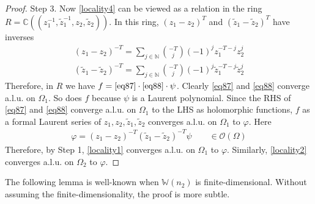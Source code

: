 \documentclass[11pt,b5paper,notitlepage]{article}
\theoremstyle{definition}
\theoremstyle{plain}
\newcommand{\mc}{\mathcal}
\newcommand{\wtd}{\widetilde}
\newcommand{\Wbb}{\mathbb W}
\newcommand{\Cbb}{\mathbb C}
\newcommand{\Nbb}{\mathbb N}
\newcommand{\<}{\left\langle}
\renewcommand{\>}{\right\rangle}
\numberwithin{equation}{subsection}
\begin{document}
\begin{proof}
Step 3. Now \eqref{locality4} can be viewed as a relation in the ring $R=\Cbb((z_1^{-1},\wtd z_1^{-1},z_2,\wtd z_2))$. In this ring, $(z_1-z_2)^T$ and $(\wtd z_1-\wtd z_2)^T$ have inverses
\begin{gather}
    (z_1-z_2)^{-T}=\sum_{j\in \Nbb}\binom{-T}{j}(-1)^j z_1^{-T-j}z_2^j  \label{eq87}\\
    (\wtd z_1-\wtd z_2)^{-T}=\sum_{j\in \Nbb}\binom{-T}{j}(-1)^j \wtd z_1^{-T-j}\wtd z_2^j \label{eq88}
\end{gather}
Therefore, in $R$ we have $f=\eqref{eq87}\cdot\eqref{eq88}\cdot\psi$. Clearly \eqref{eq87} and \eqref{eq88} converge a.l.u. on $\Omega_1$. So does $f$ because $\psi$ is a Laurent polynomial. Since the RHS of \eqref{eq87} and \eqref{eq88} converge a.l.u. on $\Omega_1$ to the LHS as holomorphic functions, $f$ as a formal Laurent series of $z_1,z_2,\wtd z_1,\wtd z_2$ converges a.l.u. on $\Omega_1$ to $\varphi$. Here
\begin{gather*}
\varphi=(z_1-z_2)^{-T} (\wtd z_1-\wtd z_2)^{-T}\psi\qquad\in\mc O(\Omega)
\end{gather*}
Therefore, by Step 1, \eqref{locality1} converges a.l.u. on $\Omega_1$ to $\varphi$. Similarly, \eqref{locality2} converges a.l.u. on $\Omega_2$ to $\varphi$.
\end{proof}

The following lemma is well-known when $\Wbb(n_2)$ is finite-dimensional. Without assuming the finite-dimensionality, the proof is more subtle.
\end{document}
